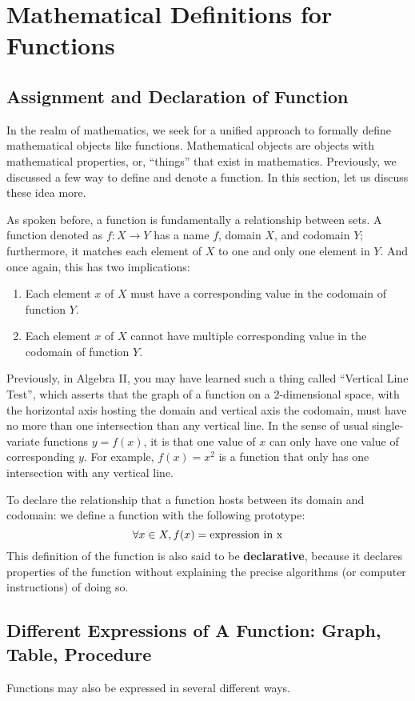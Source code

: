 \chapter{Mathematical Definitions for Functions}

\section{Assignment and Declaration of Function}
In the realm of mathematics, we seek for a unified approach to formally define mathematical objects like functions.
Mathematical objects are objects with mathematical properties, or, ``things'' that exist in mathematics.
Previously, we discussed a few way to define and denote a function. In this section, let us discuss these idea more.

As spoken before, a function is fundamentally a relationship between sets.
A function denoted as $f: X \rightarrow Y$ has a name $f$, domain $X$, and codomain $Y$; furthermore, it matches each element of $X$ to one and only one element in $Y$.
And once again, this has two implications:
\begin{enumerate}
    \item Each element $x$ of $X$ must have a corresponding value in the codomain of function $Y$.
    \item Each element $x$ of $X$ cannot have multiple corresponding value in the codomain of function $Y$.
\end{enumerate}
Previously, in Algebra II, you may have learned such a thing called ``Vertical Line Test'', which asserts that the graph of a function on a 2-dimensional space, with the horizontal axis hosting the domain and vertical axis the codomain, must have no more than one intersection than any vertical line.
In the sense of usual single-variate functions $y = f(x)$, it is that one value of $x$ can only have one value of corresponding $y$. For example, $f(x) = x^2$ is a function that only has one intersection with any vertical line.

To declare the relationship that a function hosts between its domain and codomain: we define a function with the following prototype:
\[
    \forall x \in X, f(x) = {\rm expression\ in\ x}
\]
This definition of the function is also said to be \textbf{declarative}, because it declares properties of the function without explaining the precise algorithms (or computer instructions) of doing so.

\section{Different Expressions of A Function: Graph, Table, Procedure}
Functions may also be expressed in several different ways.

